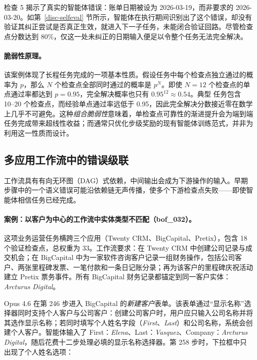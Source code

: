 检查 5 揭示了真实的智能体错误：账单日期被设为 2026-03-19，而非要求的 2026-03-20。如第~\ref{disc-selfeval} 节所示，智能体在执行期间识别出了这个错误，却没有验证其纠正尝试是否真正生效，就进入下一子任务，未能闭合验证回路。尽管检查点分数达到 80\%，仅这一处未纠正的日期输入便足以令整个任务无法完全解决。

\paragraph{脆弱性原理。} 该案例体现了长程任务完成的一项基本性质。假设任务中每个检查点独立通过的概率为 $p$，那么 $N$ 个检查点全部同时通过的概率是 $p^N$。即使 $N=12$ 个检查点的单点通过率都达到 $p=0.95$，完全解决概率也只有 $0.95^{12}\approx0.54$。典型 \datasetname 任务包含 10--20 个检查点，而经验单点通过率远低于 0.95，因此完全解决分数接近零在数学上几乎不可避免。这种\emph{组合脆弱性}意味着，单检查点可靠性的渐进提升会为端到端任务完成带来超线性收益；而通常只优化步级奖励的现有智能体训练范式，并非为利用这一性质而设计。

\subsection{多应用工作流中的错误级联}
\label{disc-cascade}

\datasetname 工作流具有有向无环图（DAG）式依赖，中间输出会成为下游操作的输入。早期步骤中的一个语义错误可能沿依赖链无声传播，使多个下游检查点失败——即使智能体相信任务已经完成。

\paragraph{案例：以客户为中心的工作流中实体类型不匹配（{\ttfamily bof\_032}）。} 这项业务运营任务横跨三个应用（Twenty CRM、BigCapital、Pretix），包含 18 个验证检查点，总权重为 33。工作流要求：在 Twenty CRM 中创建公司记录与成交机会；在 BigCapital 中为一家软件咨询客户记录一组财务操作，包括公司客户、两张里程碑发票、一笔付款和一条日记账分录；再为该客户的里程碑庆祝活动建立 Pretix 票务事件。所有 BigCapital 财务记录都锚定到同一客户实体：\emph{Arcturus Digital}。

Opus 4.6 在第 246 步进入 BigCapital 的\emph{新建客户}表单。该表单通过“显示名称”选择器同时支持个人客户与公司客户：创建公司客户时，用户应只输入公司名称并将其选作显示名称；若同时填写个人姓名字段（\emph{First}、\emph{Last}）和公司名称，系统会创建个人客户。智能体输入了 First：\emph{Elena}、Last：\emph{Vasquez}、Company：\emph{Arcturus Digital}，随后花费十二步处理必填的显示名称选择器。第 258 步时，下拉框中只出现了个人姓名选项：

